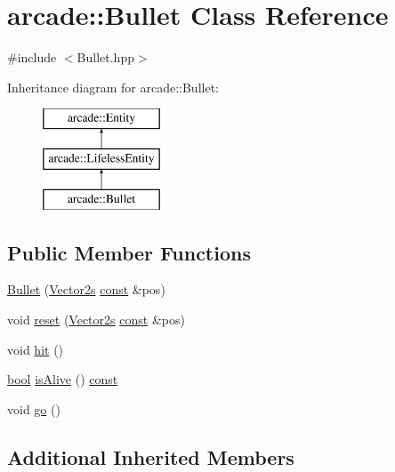 \hypertarget{classarcade_1_1_bullet}{\section{arcade\-:\-:Bullet Class Reference}
\label{classarcade_1_1_bullet}
}


{\ttfamily \#include $<$Bullet.\-hpp$>$}

Inheritance diagram for arcade\-:\-:Bullet\-:\begin{figure}[H]
\begin{center}
\leavevmode
\includegraphics[height=3.000000cm]{classarcade_1_1_bullet}
\end{center}
\end{figure}
\subsection*{Public Member Functions}
\begin{DoxyCompactItemize}
\item 
\hyperlink{classarcade_1_1_bullet_ab5d2870001ed2026ca2f4b3d2f280ac9}{Bullet} (\hyperlink{namespacearcade_a8e527f7400fbff9c38dc31e0a3dd06a1}{Vector2s} \hyperlink{term__entry_8h_a57bd63ce7f9a353488880e3de6692d5a}{const} \&pos)
\item 
void \hyperlink{classarcade_1_1_bullet_a02b7e310d554128374708c6a800e0ed2}{reset} (\hyperlink{namespacearcade_a8e527f7400fbff9c38dc31e0a3dd06a1}{Vector2s} \hyperlink{term__entry_8h_a57bd63ce7f9a353488880e3de6692d5a}{const} \&pos)
\item 
void \hyperlink{classarcade_1_1_bullet_aca02373eda709bd6415b8b1b580ad84a}{hit} ()
\item 
\hyperlink{term__entry_8h_a002004ba5d663f149f6c38064926abac}{bool} \hyperlink{classarcade_1_1_bullet_a9571e8d7f515dd97d6e5f6558d422967}{is\-Alive} () \hyperlink{term__entry_8h_a57bd63ce7f9a353488880e3de6692d5a}{const} 
\item 
void \hyperlink{classarcade_1_1_bullet_a4c08993a4897243947a93ff91d2c98eb}{go} ()
\end{DoxyCompactItemize}
\subsection*{Additional Inherited Members}


